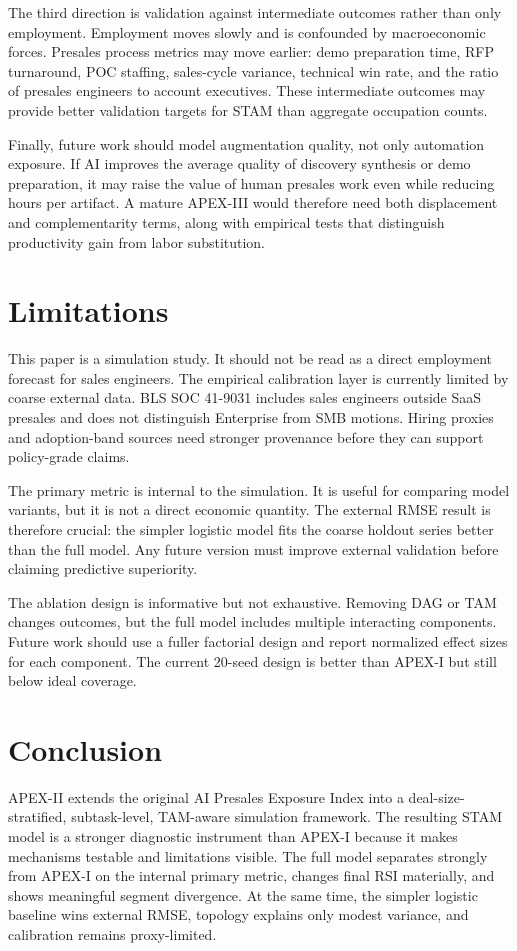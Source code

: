 \documentclass[10pt,conference]{IEEEtran}
\begin{document}
The third direction is validation against intermediate outcomes rather than only employment. Employment moves slowly and is confounded by macroeconomic forces. Presales process metrics may move earlier: demo preparation time, RFP turnaround, POC staffing, sales-cycle variance, technical win rate, and the ratio of presales engineers to account executives. These intermediate outcomes may provide better validation targets for STAM than aggregate occupation counts.

Finally, future work should model augmentation quality, not only automation exposure. If AI improves the average quality of discovery synthesis or demo preparation, it may raise the value of human presales work even while reducing hours per artifact. A mature APEX-III would therefore need both displacement and complementarity terms, along with empirical tests that distinguish productivity gain from labor substitution.

\section{Limitations}
This paper is a simulation study. It should not be read as a direct employment forecast for sales engineers. The empirical calibration layer is currently limited by coarse external data. BLS SOC 41-9031 includes sales engineers outside SaaS presales and does not distinguish Enterprise from SMB motions. Hiring proxies and adoption-band sources need stronger provenance before they can support policy-grade claims.

The primary metric is internal to the simulation. It is useful for comparing model variants, but it is not a direct economic quantity. The external RMSE result is therefore crucial: the simpler logistic model fits the coarse holdout series better than the full model. Any future version must improve external validation before claiming predictive superiority.

The ablation design is informative but not exhaustive. Removing DAG or TAM changes outcomes, but the full model includes multiple interacting components. Future work should use a fuller factorial design and report normalized effect sizes for each component. The current 20-seed design is better than APEX-I but still below ideal coverage.

\section{Conclusion}
APEX-II extends the original AI Presales Exposure Index into a deal-size-stratified, subtask-level, TAM-aware simulation framework. The resulting STAM model is a stronger diagnostic instrument than APEX-I because it makes mechanisms testable and limitations visible. The full model separates strongly from APEX-I on the internal primary metric, changes final RSI materially, and shows meaningful segment divergence. At the same time, the simpler logistic baseline wins external RMSE, topology explains only modest variance, and calibration remains proxy-limited.
\end{document}
